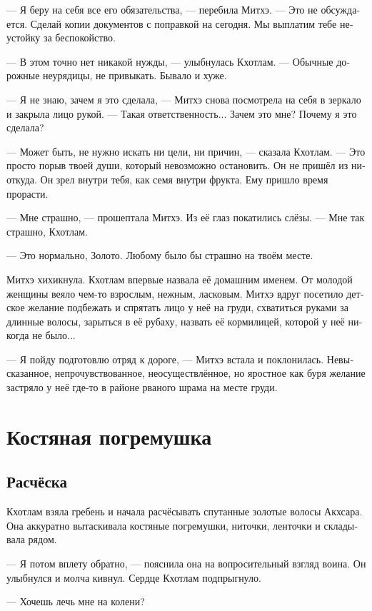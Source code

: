\documentclass[a4paper,12pt,fleqn]{book}\usepackage{cooltooltips}\usepackage{polyglossia}\setdefaultlanguage[babelshorthands=true]{russian}\setotherlanguage{english}\defaultfontfeatures{Ligatures=TeX,Mapping=tex-text} \usepackage{xcolor}\definecolor{lightgray}{HTML}{bbbbbb}\color{lightgray}\newcommand{\ml}[3]{\textenglish{\textcolor{black}{#3}} }
\begin{document}
--- Я беру на себя все его обязательства, --- перебила Митхэ.
--- Это не обсуждается.
Сделай копии документов с поправкой на сегодня.
Мы выплатим тебе неустойку за беспокойство.

--- В этом точно нет никакой нужды, --- улыбнулась Кхотлам.
--- Обычные дорожные неурядицы, не привыкать.
Бывало и хуже.

--- Я не знаю, зачем я это сделала, --- Митхэ снова посмотрела на себя в зеркало и закрыла лицо рукой.
--- Такая ответственность...
Зачем это мне?
Почему я это сделала?

--- Может быть, не нужно искать ни цели, ни причин, --- сказала Кхотлам.
--- Это просто порыв твоей души, который невозможно остановить.
Он не пришёл из ниоткуда.
Он зрел внутри тебя, как семя внутри фрукта.
Ему пришло время прорасти.

--- Мне страшно, --- прошептала Митхэ.
Из её глаз покатились слёзы.
--- Мне так страшно, Кхотлам.

--- Это нормально, Золото.
Любому было бы страшно на твоём месте.

Митхэ хихикнула.
Кхотлам впервые назвала её домашним именем.
От молодой женщины веяло чем-то взрослым, нежным, ласковым.
Митхэ вдруг посетило детское желание подбежать и спрятать лицо у неё на груди, схватиться руками за длинные волосы, зарыться в её рубаху, назвать её кормилицей, которой у неё никогда не было...

--- Я пойду подготовлю отряд к дороге, --- Митхэ встала и поклонилась.
Невысказанное, непрочувствованное, неосуществлённое, но яростное как буря желание застряло у неё где-то в районе рваного шрама на месте груди.

\chapter{Костяная погремушка}

\section{Расчёска}

Кхотлам взяла гребень и начала расчёсывать спутанные золотые волосы Акхсара.
Она аккуратно вытаскивала костяные погремушки, ниточки, ленточки и складывала рядом.

--- Я потом вплету обратно, --- пояснила она на вопросительный взгляд воина.
Он улыбнулся и молча кивнул.
Сердце Кхотлам подпрыгнуло.

--- Хочешь лечь мне на колени?
\end{document}

